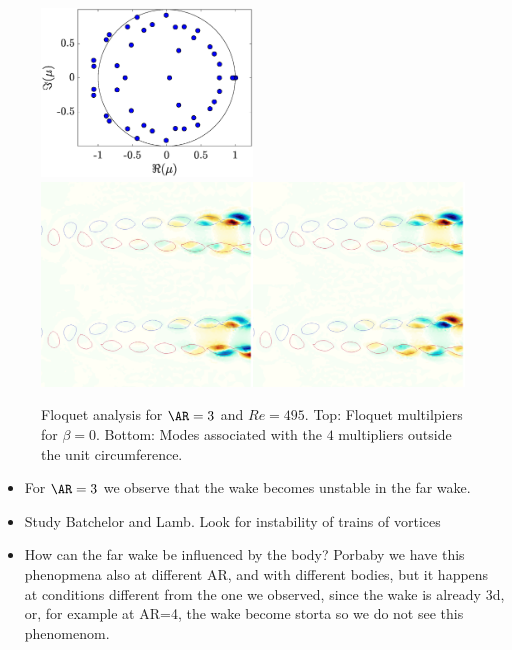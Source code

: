 \begin{figure}
  \centering
  \includegraphics[width=0.5\textwidth]{./fig/AR3/mult_Re495_beta0.eps}
  \includegraphics[width=1.0\textwidth]{./fig/AR3/Floquet_modes_beta_0_Re495.png}
  \caption{Floquet analysis for $\AR=3$ and $Re=495$. Top: Floquet multilpiers for $\beta = 0$. Bottom: Modes associated with the $4$ multipliers outside the unit circumference.}
  \label{fig:AR3_Stab}
\end{figure}

\begin{itemize}
  \item For $\AR=3$ we observe that the wake becomes unstable in the far wake.
  \item Study Batchelor and Lamb. Look for instability of trains of vortices
  \item How can the far wake be influenced by the body? Porbaby we have this phenopmena also at different AR, and with different bodies, but it happens at conditions different from the one we observed, since the wake is already 3d, or, for example at AR=4, the wake become storta so we do not see this phenomenom.
\end{itemize}

\fi
